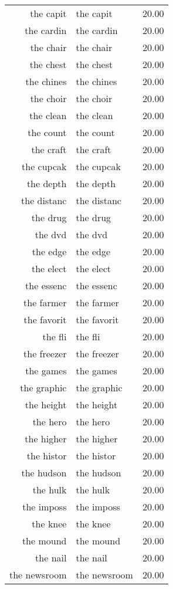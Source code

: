 \begin{table}[ht]
\begin{tabular}{rlr}
  the capit & the capit & 20.00 \\ 
  the cardin & the cardin & 20.00 \\ 
  the chair & the chair & 20.00 \\ 
  the chest & the chest & 20.00 \\ 
  the chines & the chines & 20.00 \\ 
  the choir & the choir & 20.00 \\ 
  the clean & the clean & 20.00 \\ 
  the count & the count & 20.00 \\ 
  the craft & the craft & 20.00 \\ 
  the cupcak & the cupcak & 20.00 \\ 
  the depth & the depth & 20.00 \\ 
  the distanc & the distanc & 20.00 \\ 
  the drug & the drug & 20.00 \\ 
  the dvd & the dvd & 20.00 \\ 
  the edge & the edge & 20.00 \\ 
  the elect & the elect & 20.00 \\ 
  the essenc & the essenc & 20.00 \\ 
  the farmer & the farmer & 20.00 \\ 
  the favorit & the favorit & 20.00 \\ 
  the fli & the fli & 20.00 \\ 
  the freezer & the freezer & 20.00 \\ 
  the games & the games & 20.00 \\ 
  the graphic & the graphic & 20.00 \\ 
  the height & the height & 20.00 \\ 
  the hero & the hero & 20.00 \\ 
  the higher & the higher & 20.00 \\ 
  the histor & the histor & 20.00 \\ 
  the hudson & the hudson & 20.00 \\ 
  the hulk & the hulk & 20.00 \\ 
  the imposs & the imposs & 20.00 \\ 
  the knee & the knee & 20.00 \\ 
  the mound & the mound & 20.00 \\ 
  the nail & the nail & 20.00 \\ 
  the newsroom & the newsroom & 20.00 \\ 

\end{tabular}
\end{table}
